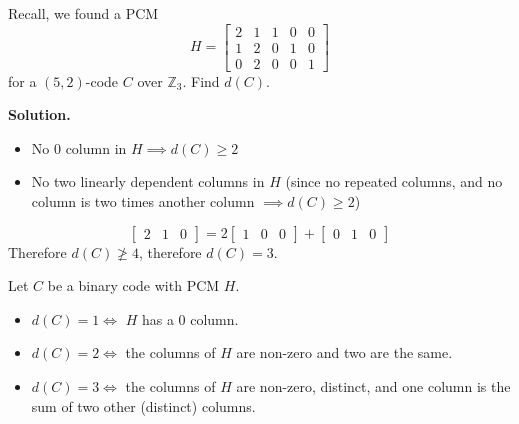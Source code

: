 \begin{exbox}
    \begin{example}
        Recall, we found a PCM
        \[ H=
            \left[\begin{array}{cc|ccc}
                    2 & 1 & 1 & 0 & 0 \\
                    1 & 2 & 0 & 1 & 0 \\
                    0 & 2 & 0 & 0 & 1
                \end{array}\right] \]
        for a $ (5,2) $-code $ C $ over $ \mathbb{Z}_3 $. Find $ d(C) $.

        \textbf{Solution.}
        \begin{itemize}
            \item No $ 0 $ column in $ H\implies d(C)\geqslant 2 $
            \item No two linearly dependent columns in $ H $ (since
                  no repeated columns, and no column is two times another
                  column $ \implies d(C)\geqslant 2 $)
        \end{itemize}
        \[ \begin{bmatrix} 2 & 1 & 0 \end{bmatrix}
            = 2\begin{bmatrix} 1 & 0 & 0 \end{bmatrix}
            + \begin{bmatrix} 0 & 1 & 0 \end{bmatrix} \]
        Therefore $ d(C)\ngeqslant 4 $, therefore $ d(C)=3 $.
    \end{example}
\end{exbox}

\begin{exbox}
    \begin{example}
        Let $ C $ be a binary code with PCM $ H $.
        \begin{itemize}
            \item $ d(C)=1\iff  $ $ H $ has a $ 0 $ column.
            \item $ d(C)=2\iff $ the columns of $ H $ are non-zero and two are
                  the same.
            \item $ d(C)=3\iff $ the columns of $ H $ are non-zero, distinct, and one
                  column is the sum of two other (distinct) columns.
        \end{itemize}
    \end{example}
\end{exbox}

